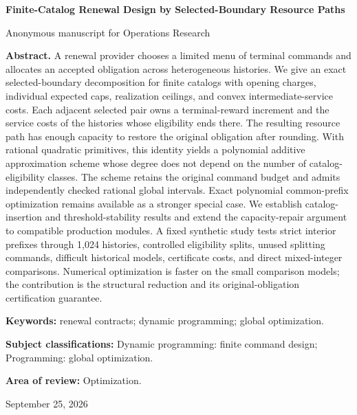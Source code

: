 \documentclass[11pt,letterpaper]{article}
\theoremstyle{definition}\newtheorem{remark}[theorem]{Remark}
\begin{document}
\hypersetup{pageanchor=false}
\begin{titlepage}\centering
{\Large\bfseries Finite-Catalog Renewal Design by Selected-Boundary Resource Paths\par}
\vspace{0.25in}Anonymous manuscript for Operations Research\par\vspace{0.20in}
\begin{minipage}{\textwidth}\textbf{Abstract.} A renewal provider chooses a limited menu of terminal commands and allocates an accepted obligation across heterogeneous histories. We give an exact selected-boundary decomposition for finite catalogs with opening charges, individual expected caps, realization ceilings, and convex intermediate-service costs. Each adjacent selected pair owns a terminal-reward increment and the service costs of the histories whose eligibility ends there. The resulting resource path has enough capacity to restore the original obligation after rounding. With rational quadratic primitives, this identity yields a polynomial additive approximation scheme whose degree does not depend on the number of catalog-eligibility classes. The scheme retains the original command budget and admits independently checked rational global intervals. Exact polynomial common-prefix optimization remains available as a stronger special case. We establish catalog-insertion and threshold-stability results and extend the capacity-repair argument to compatible production modules. A fixed synthetic study tests strict interior prefixes through 1,024 histories, controlled eligibility splits, unused splitting commands, difficult historical models, certificate costs, and direct mixed-integer comparisons. Numerical optimization is faster on the small comparison models; the contribution is the structural reduction and its original-obligation certification guarantee.
\par\vspace{0.15in}\textbf{Keywords:} renewal contracts; dynamic programming; global optimization.
\par\vspace{0.10in}\textbf{Subject classifications:} Dynamic programming: finite command design; Programming: global optimization.
\par\vspace{0.10in}\textbf{Area of review:} Optimization.
\end{minipage}\vfill September 25, 2026\end{titlepage}
\hypersetup{pageanchor=true}








\clearpage{}\label{refs-start}

\label{refs-end}\clearpage

\clearpage
\end{document}
